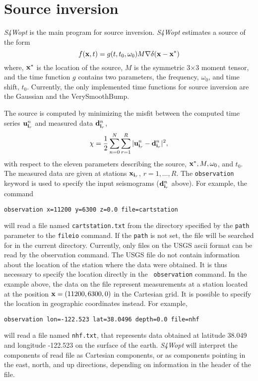\documentclass[11pt]{report}
\begin{document}
\chapter{Source inversion}
\emph{S4Wopt} is the main program for source inversion. \emph{S4Wopt} estimates a source of the form
$$
 f({\bf x},t) =  g(t,t_0,\omega_0)M\nabla\delta({\bf x}-{\bf x}^*)
$$
where, ${\bf x}^*$ is the location of the source, $M$ is the symmetric 3$\times$3 moment tensor, and the time
function $g$ contains two parameters, the frequency, $\omega_0$, and time shift, $t_0$. Currently, the only
implemented time functions for source inversion are the Gaussian and the VerySmoothBump.
\par
The source is computed by minimizing the misfit between the computed
time series ${\bf u}^n_{{\bf i}_r}$ and measured data ${\bf d}^n_{{\bf i}_r}$,
$$
 \chi = \frac{1}{2}\sum_{n=0}^N \sum_{r=1}^R |{\bf u}^n_{{\bf i}_r}-{\bf d}^n_{{\bf i}_r}|^2,
$$
with respect to the eleven parameters describing the source, ${\bf x}^*, M, \omega_0$, and $t_0$.
The measured data are given at stations ${\bf x}_{{\bf i}_r}$, $r=1,\ldots,R$.
The {\tt observation} keyword is used to specify the input seismograms (${\bf d}^n_{{\bf i}_r}$ above). 
For example, the command
%
\begin{verbatim}
observation x=11200 y=6300 z=0.0 file=cartstation
\end{verbatim}
%
will read a file named {\tt cartstation.txt} from the directory specified by the {\tt path}
parameter to the {\tt fileio} command. If the {\tt path} is not set, the file will be searched for
in the current directory. Currently, only files on the USGS ascii format can be read by the
observation command. The USGS file do not contain information about the location of the station
where the data were obtained. It is thus necessary to specify the location directly in the {\tt
  observation} command. In the example above, the data on the file represent measurements at a
station located at the position ${\bf x} = (11200,6300,0)$ in the Cartesian grid. It is possible to
specify the location in geographic coordinates instead. For example,
%
\begin{verbatim}
observation lon=-122.523 lat=38.0496 depth=0.0 file=nhf 
\end{verbatim}
%
will read a file named {\tt nhf.txt}, that represents data obtained at latitude 38.049 and longitude
-122.523 on the surface of the earth.  \emph{S4Wopt} will interpret the components of read file as
Cartesian components, or as components pointing in the east, north, and up directions, depending on
information in the header of the file.  
\end{document}
